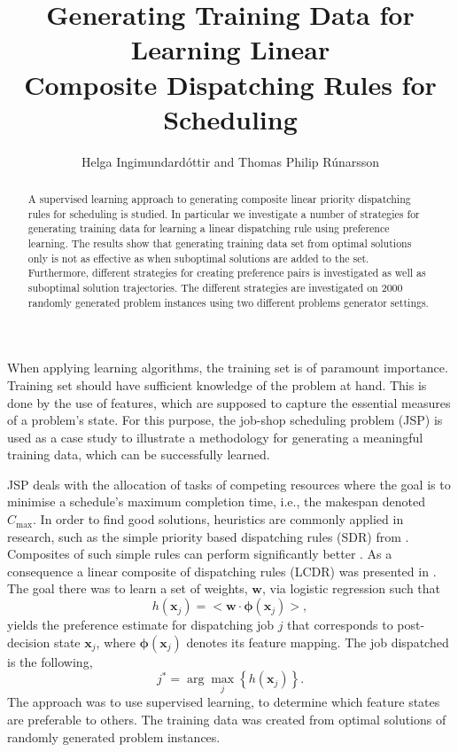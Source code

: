 \documentclass[smallextended]{llncs}
\newcommand{\vphi}{{\boldsymbol{\phi}}}
\renewcommand{\vec}[1]{\mathbf{#1}}
\newcommand{\shortcite}[1]{\cite{#1}}
\begin{document}
\title{Generating Training Data for Learning Linear \\ Composite Dispatching Rules for Scheduling}
\author{Helga Ingimundard\'ottir and Thomas Philip R\'unarsson}

\maketitle
\begin{abstract}
A supervised learning approach to generating composite linear priority dispatching rules for scheduling is studied. In particular we investigate a number of strategies for generating training data for learning a linear dispatching rule using preference learning. The results show that generating training data set from optimal solutions only is not as effective as when suboptimal solutions are added to the set. Furthermore, different strategies for creating preference pairs is investigated as well as suboptimal solution trajectories. The different strategies are investigated on 2000 randomly generated problem instances using two different problems generator settings.
\end{abstract}

\noindent When applying learning algorithms, the training set is of paramount importance. Training set should have sufficient knowledge of the problem at hand. This is done by the use of features, which are supposed to capture the essential measures of a problem's state. For this purpose, the job-shop scheduling problem (JSP) is used as a case study to illustrate a methodology for generating a meaningful training data, which can be successfully learned. 

JSP deals with the allocation of tasks of competing resources where the goal is to minimise a schedule's maximum completion time, i.e., the makespan denoted $C_{\max}$. In order to find good solutions, heuristics are commonly applied in research, such as the simple priority based dispatching rules (SDR) from \cite{Panwalkar77}. Composites of such simple rules can perform significantly better \cite{Jayamohan04}. 
As a consequence a linear composite of dispatching rules (LCDR) was presented  in \shortcite{InRu11a}. The goal there was to learn a set of weights, $\vec{w}$, via logistic regression such that 
\begin{equation}\label{eq:jssp:linweights}
h(\vec{x}_j)=\big<{\vec{w}}\cdot{\vphi(\vec{x}_j)}\big>,
\end{equation}
yields the preference estimate for dispatching job $j$ that corresponds to post-decision state $\vec{x}_j$, where $\vphi(\vec{x}_j)$ denotes its feature mapping. The job dispatched is the following, 
\begin{equation}\label{eq:jstar}
j^* = \arg\max_j\left\{h(\vec{x}_j)\right\}. 
\end{equation}
The approach was to use supervised learning, to determine which feature states are preferable to others. 
The training data was created from optimal solutions of randomly generated problem instances. 
\end{document}
